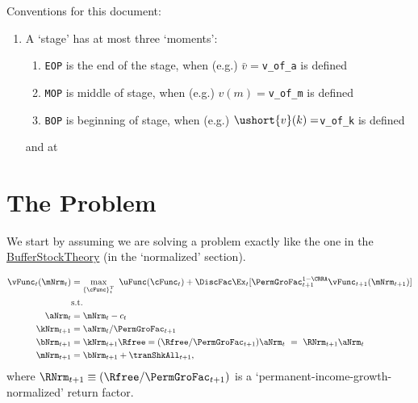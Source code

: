 \documentclass[\econtexRoot/BufferStockTheory]{subfiles}
\newcommand{\EOP}{\bar}
\newcommand{\MOP}{}
\newcommand{\BOP}{\ushort}
\begin{document}


\hypertarget{ApndxSolutionSteps}{}

Conventions for this document:
\begin{enumerate}
\item A `stage' has at most three `moments':
  \begin{enumerate}
  \item \texttt{EOP} is the end of the stage, when (e.g.) $\EOP{v}=$\texttt{v\_of\_a} is defined
  \item \texttt{MOP} is middle of stage, when (e.g.) $\MOP{v}(m)=$\texttt{v\_of\_m} is defined
  \item \texttt{BOP} is beginning of stage, when (e.g.) $\BOP{v}(k)=$\texttt{v\_of\_k} is defined
  \end{enumerate}

  and at 

\end{enumerate}


\section{The Problem}

We start by assuming we are solving a problem exactly like the one in the \href{https://econ-ark.github.io/BufferStockTheory}{BufferStockTheory} (in the `normalized' section).

\begin{equation*}\label{eq:veqn}
  \begin{split}
    \vFunc_{t}(\mNrm_{t})  & = \max_{{\{\cFunc\}}_{t}^{T}}~  \uFunc(\cFunc_{t}) +\DiscFac \Ex_{t}[\PermGroFac_{t+1}^{1-\CRRA}\vFunc_{t+1}({\mNrm}_{t+1})]  \\
    & \mbox{s.t.}
    \\ {\aNrm}_{t}  & = \mNrm_{t}-c_{t}
    \\ {\kNrm}_{t+1} & = \aNrm_{t}/\PermGroFac_{t+1}
    \\ {\bNrm}_{t+1}  & = {\kNrm}_{t+1}\Rfree = (\Rfree/\PermGroFac_{t+1})\aNrm_{t}  ~ = ~ \RNrm_{t+1}\aNrm_{t}
    \\ \mNrm_{t+1}  & = \bNrm_{t+1}+\tranShkAll_{t+1}  ,
  \end{split}
\end{equation*}
where $\RNrm_{t+1}\equiv (\Rfree/\PermGroFac_{t+1})$ is a `permanent-income-growth-normalized' return factor.
\end{document}
